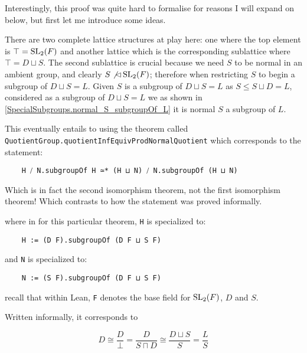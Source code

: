 \begin{remark}
Interestingly, this proof was quite hard to formalise for reasons I will expand on below, but first let me introduce some ideas.

There are two complete lattice structures at play here: one where the top element is $\top = \operatorname{SL}_2(F)$ and another lattice which is the corresponding sublattice where $\top = D \sqcup S$.
The second sublattice is crucial because we need $S$ to be normal in an ambient group, and clearly $S \not\lhd \operatorname{SL}_2(F)$; therefore when restricting $S$ to begin a subgroup of $D \sqcup S = L$. Given $S$ is a subgroup of $D \sqcup S = L$ as $S \le S\sqcup D = L$, considered as a subgroup of $D \sqcup S = L$ we as shown in \ref{SpecialSubgroups.normal_S_subgroupOf_L}
it is normal $S$ a subgroup of $L$.

This eventually entails to using the theorem called 
\texttt{QuotientGroup.quotientInfEquivProdNormalQuotient} which corresponds to the statement:

\begin{footnotesize}
\begin{verbatim}
    H ⧸ N.subgroupOf H ≃* (H ⊔ N) ⧸ N.subgroupOf (H ⊔ N)
\end{verbatim}
\end{footnotesize}


Which is in fact the second isomorphism theorem, not the first isomorphism theorem! Which contrasts to how the statement was proved informally.

where in for this particular theorem, \texttt{H} is specialized to:

\begin{footnotesize}
\begin{verbatim}
    H := (D F).subgroupOf (D F ⊔ S F)
\end{verbatim}
\end{footnotesize}


and  \texttt{N} is specialized to:

\begin{footnotesize}
\begin{verbatim}
    N := (S F).subgroupOf (D F ⊔ S F)
\end{verbatim}
\end{footnotesize}


recall that within Lean, \texttt{F} denotes the base field for $\operatorname{SL}_2(F)$, $D$ and $S$.

Written informally, it corresponds to

\[
D \cong \frac{D}{\bot} = \frac{D}{S \sqcap D} \cong \frac{D \sqcup S}{S} = \frac{L}{S}
\]


\end{remark}


